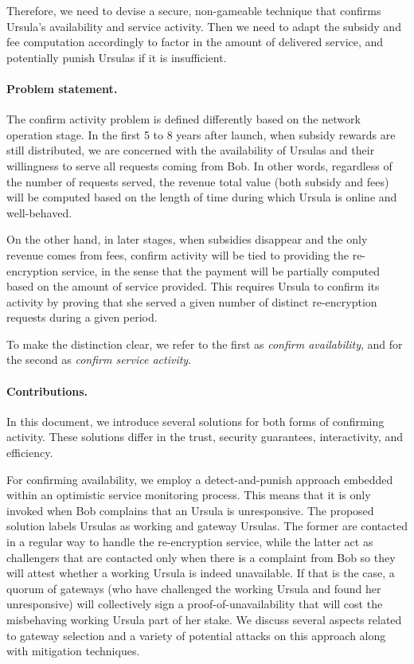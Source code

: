 Therefore, we need to devise a secure, non-gameable technique that confirms Ursula's availability and service activity. Then we need to adapt the subsidy and fee computation accordingly to factor in the amount of delivered service, and potentially punish Ursulas if it is insufficient. 


\paragraph{\bf Problem statement.}
The confirm activity problem is defined differently based on the network operation stage. In the first 5 to 8 years after launch, when subsidy rewards are still distributed, we are concerned with the availability of Ursulas and their willingness to serve all requests coming from Bob. In other words, regardless of the number of requests served, the revenue total value (both subsidy and fees) will be computed based on the length of time during which Ursula is online and well-behaved. 


On the other hand, in later stages, when subsidies disappear and the only revenue comes from fees, confirm activity will be tied to providing the re-encryption service, in the sense that the payment will be partially computed based on the amount of service provided. This requires Ursula to confirm its activity by proving that she served a given number of distinct re-encryption requests during a given period. 


To make the distinction clear, we refer to the first as \emph{confirm availability}, and for the second as \emph{confirm service activity}.


\paragraph{\bf Contributions.}
In this document, we introduce several solutions for both forms of confirming activity. These solutions differ in the trust, security guarantees, interactivity, and efficiency. 


For confirming availability, we employ a detect-and-punish approach embedded within an optimistic service monitoring process. This means that it is only invoked when Bob complains that an Ursula is unresponsive. The proposed solution labels Ursulas as working and gateway Ursulas. The former are contacted in a regular way to handle the re-encryption service, while the latter act as challengers that are contacted only when there is a complaint from Bob so they will attest whether a working Ursula is indeed unavailable. If that is the case, a quorum of gateways (who have challenged the working Ursula and found her unresponsive) will collectively sign a proof-of-unavailability that will cost the misbehaving working Ursula part of her stake. We discuss several aspects related to gateway selection and a variety of potential attacks on this approach along with mitigation techniques.


